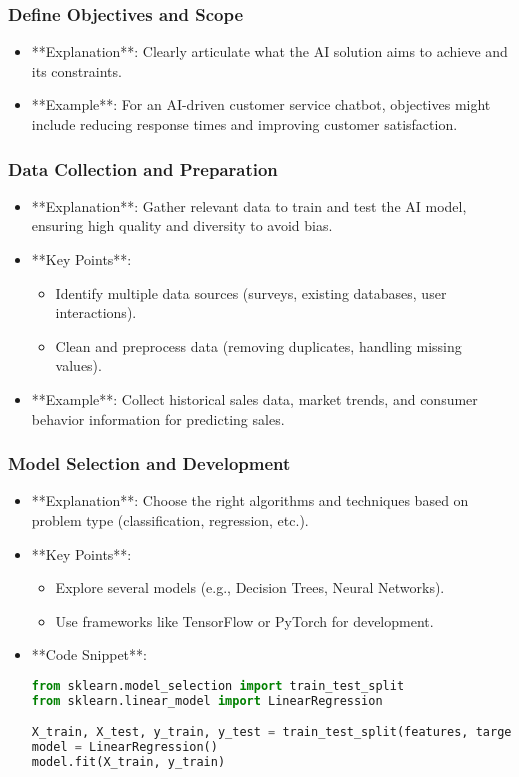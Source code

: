 \documentclass[aspectratio=169]{beamer}
\begin{document}
\begin{frame}
    \frametitle{Define Objectives and Scope}
    \begin{itemize}
        \item **Explanation**: Clearly articulate what the AI solution aims to achieve and its constraints.
        \item **Example**: For an AI-driven customer service chatbot, objectives might include reducing response times and improving customer satisfaction.
    \end{itemize}
\end{frame}

\begin{frame}
    \frametitle{Data Collection and Preparation}
    \begin{itemize}
        \item **Explanation**: Gather relevant data to train and test the AI model, ensuring high quality and diversity to avoid bias.
        \item **Key Points**:
            \begin{itemize}
                \item Identify multiple data sources (surveys, existing databases, user interactions).
                \item Clean and preprocess data (removing duplicates, handling missing values).
            \end{itemize}
        \item **Example**: Collect historical sales data, market trends, and consumer behavior information for predicting sales.
    \end{itemize}
\end{frame}

\begin{frame}[fragile]
    \frametitle{Model Selection and Development}
    \begin{itemize}
        \item **Explanation**: Choose the right algorithms and techniques based on problem type (classification, regression, etc.).
        \item **Key Points**:
            \begin{itemize}
                \item Explore several models (e.g., Decision Trees, Neural Networks).
                \item Use frameworks like TensorFlow or PyTorch for development.
            \end{itemize}
        \item **Code Snippet**:
        \begin{lstlisting}[language=Python]
from sklearn.model_selection import train_test_split
from sklearn.linear_model import LinearRegression

X_train, X_test, y_train, y_test = train_test_split(features, target, test_size=0.2)
model = LinearRegression()
model.fit(X_train, y_train)
        \end{lstlisting}
    \end{itemize}
\end{frame}
\end{document}
